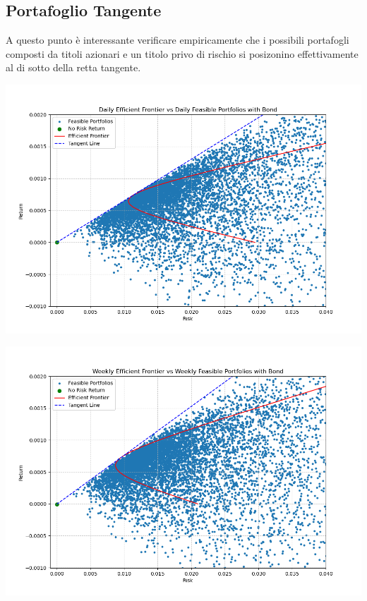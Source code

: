 \documentclass[compress]{beamer}
\begin{document}
\subsection{Portafoglio Tangente}
\begin{frame}{\subsecname}
	A questo punto è interessante verificare empiricamente che i possibili portafogli composti da titoli azionari e un titolo privo di rischio si posizonino effettivamente al di sotto della retta tangente. 
	\vspace{-0.6cm}
	\begin{minipage}{0.65\textwidth}
		\centering
		\includegraphics[width=1\linewidth]{images/Daily Efficient Frontier vs Daily Feasible Portfolios with Bond.png}
	\end{minipage}
	\hfill
	\begin{minipage}{0.30\textwidth}
		\centering
		\includegraphics[width=1\linewidth]{images/Weekly Efficient Frontier vs Weekly Feasible Portfolios with Bond.png}

\end{minipage}
\end{frame}
\end{document}
